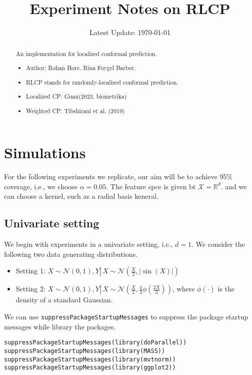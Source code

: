 \documentclass[UTF8, a4paper]{article}
\title{Experiment Notes on RLCP}
\author{}
\date{Latest Update: \today}
\begin{document}
\maketitle

\begin{abstract}
An implementation for localized conformal prediction.
\begin{itemize}
    \item Author: Rohan Hore, Rina Foygel Barber\cite{hore2024conformalpredictionlocalweights}.
    \item RLCP stands for randomly-localized conformal prediction.
    \item Localized CP: Guan(2023, biometrika)
    \item Weighted CP: Tibshirani et al. (2019)
\end{itemize}
\end{abstract}


\section{Simulations}

For the following experiments we replicate, 
our aim will be to achieve 95\% coverage, i.e., we choose \(\alpha = 0.05\).
The feature spce is given bt \(\mathcal{X} = \mathbb{R}^d\).
and we can choose a kernel, such as a radial basis keneral.

\subsection{Univariate setting}

We begin with experiments in a univariate setting, i.e., \(d = 1\). 
We consider the following two data generating distributions.
\begin{itemize}
    \item  Setting 1: $X \sim \mathcal{N}(0,1), Y \left\lvert\, X \sim \mathcal{N}\left(\frac{X}{2},|\sin (X)|\right)\right.$
    \item Setting 2: $X \sim \mathcal{N}(0,1), Y \left\lvert\, X \sim \mathcal{N}\left(\frac{X}{2}, \frac{4}{3} \phi\left(\frac{2 X}{3}\right)\right)\right.$, where $\phi(\cdot)$ is the density of a standard Gaussian.
\end{itemize}

We can use {\tt suppressPackageStartupMessages} to suppress the package startup messages while library the packages.
\begin{verbatim}
suppressPackageStartupMessages(library(doParallel))
suppressPackageStartupMessages(library(MASS))
suppressPackageStartupMessages(library(mvtnorm))
suppressPackageStartupMessages(library(ggplot2))
\end{verbatim}
\end{document}

